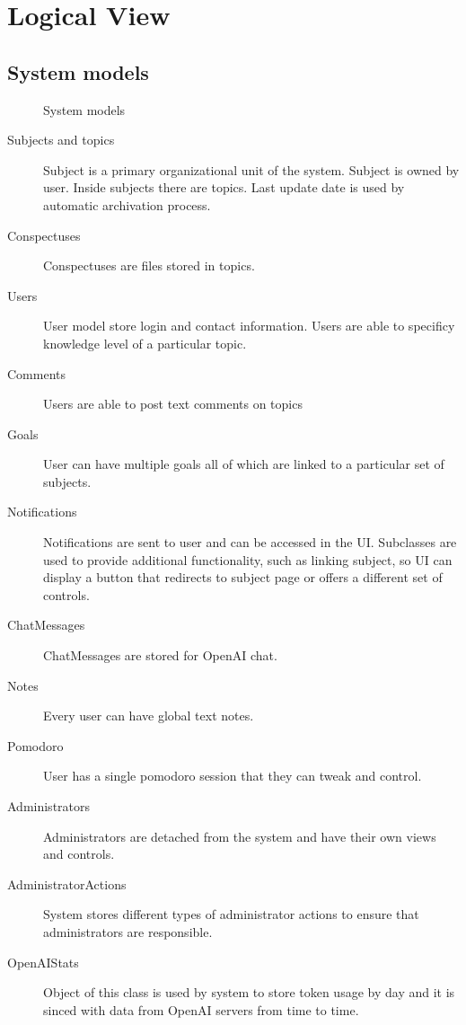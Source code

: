 \documentclass[
    english, %
]{VUMIFPSkursinis}
\begin{document}
\section{Logical View}

\subsection{System models}

\begin{figure}[ht]
    \centering
    
    \label{system-models}
    \caption{System models}
\end{figure}

\begin{description}
    \item[Subjects and topics] Subject is a primary organizational unit of the system. Subject is owned by user. Inside subjects there are topics. Last update date is used by automatic archivation process.
    \item[Conspectuses] Conspectuses are files stored in topics.
    \item[Users] User model store login and contact information. Users are able to specificy knowledge level of a particular topic.
    \item[Comments] Users are able to post text comments on topics
    \item[Goals] User can have multiple goals all of which are linked to a particular set of subjects.
    \item[Notifications] Notifications are sent to user and can be accessed in the UI. Subclasses are used to provide additional functionality, such as linking subject, so UI can display a button that redirects to subject page or offers a different set of controls.
    \item[ChatMessages] ChatMessages are stored for OpenAI chat.
    \item[Notes] Every user can have global text notes.
    \item[Pomodoro] User has a single pomodoro session that they can tweak and control.
    \item[Administrators] Administrators are detached from the system and have their own views and controls.
    \item[AdministratorActions] System stores different types of administrator actions to ensure that administrators are responsible.
    \item[OpenAIStats] Object of this class is used by system to store token usage by day and it is sinced with data from OpenAI servers from time to time.
\end{description}
\end{document}
